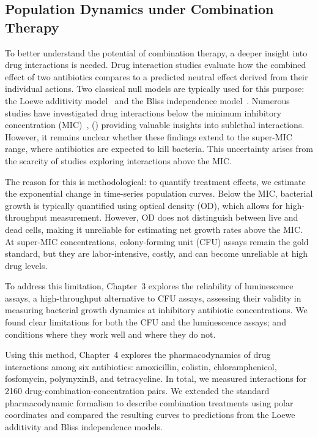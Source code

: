 \documentclass[../main.tex]{subfiles}
\begin{document}
\subsection{Population Dynamics under Combination Therapy}
To better understand the potential of combination therapy, a deeper insight into drug interactions is needed.
Drug interaction studies evaluate how the combined effect of two antibiotics compares to a predicted neutral effect derived from their individual actions.
Two classical null models are typically used for this purpose: the Loewe additivity model~\cite{Loewe1926} and the Bliss independence model~\cite{Bliss1939}.
Numerous studies have investigated drug interactions below the minimum inhibitory concentration (MIC)~\cite{Yeh2006}, (\cite{...}) providing valuable insights into sublethal interactions.
However, it remains unclear whether these findings extend to the super-MIC range, where antibiotics are expected to kill bacteria.
This uncertainty arises from the scarcity of studies exploring interactions above the MIC.

The reason for this is methodological: to quantify treatment effects, we estimate the exponential change in time-series population curves.
Below the MIC, bacterial growth is typically quantified using optical density (OD), which allows for high-throughput measurement.
However, OD does not distinguish between live and dead cells, making it unreliable for estimating net growth rates above the MIC.
At super-MIC concentrations, colony-forming unit (CFU) assays remain the gold standard, but they are labor-intensive, costly, and can become unreliable at high drug levels.

To address this limitation, Chapter~3 explores the reliability of luminescence assays, a high-throughput alternative to CFU assays, assessing their validity in measuring bacterial growth dynamics at inhibitory antibiotic concentrations.
We found clear limitations for both the CFU and the luminescence assays; and conditions where they work well and where they do not.

Using this method, Chapter~4 explores the pharmacodynamics of drug interactions among six antibiotics: amoxicillin, colistin, chloramphenicol, fosfomycin, polymyxinB, and tetracycline.
In total, we measured interactions for 2160 drug-combination-concentration pairs.
We extended the standard pharmacodynamic formalism to describe combination treatments using polar coordinates and compared the resulting curves to predictions from the Loewe additivity and Bliss independence models.
\end{document}
